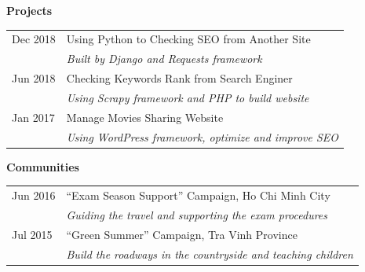 \documentclass[12pt,a4paper]{article}
\begin{document}
	\textbf{\large\color{royalblue}Projects}
	\begin{center}
		\begin{tabular}{m{20mm} m{95mm}}
			\color{gray}Dec 2018 & Using Python to Checking SEO from Another Site \\
			& \textit{\small\small\color{gray}Built by Django and Requests framework} \\
			\color{gray}Jun 2018 & Checking Keywords Rank from Search Enginer \\
			& \textit{\small\small\color{gray}Using Scrapy framework and PHP to build website} \\
			\color{gray}Jan 2017 & Manage Movies Sharing Website \\
			& \textit{\small\small\color{gray}Using WordPress framework, optimize and improve SEO} \\
		\end{tabular}
	\end{center}
	
	\textbf{\large\color{royalblue}Communities}
	\begin{center}
		\begin{tabular}{m{20mm} m{95mm}}
			\color{gray}Jun 2016 & ``Exam Season Support'' Campaign, Ho Chi Minh City \\
			& \textit{\small\small\color{gray}Guiding the travel and supporting the exam procedures} \\
			\color{gray}Jul 2015 & ``Green Summer'' Campaign, Tra Vinh Province \\
			& \textit{\small\small\color{gray}Build the roadways in the countryside and teaching children} \\
		\end{tabular}
	\end{center}
\end{document}
